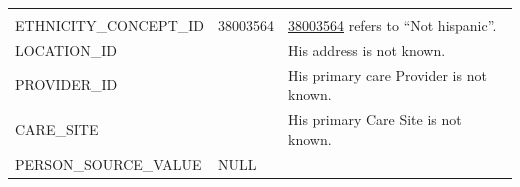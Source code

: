 \documentclass[11pt]{book}
\theoremstyle{definition}
\theoremstyle{definition}
\theoremstyle{definition}
\theoremstyle{remark}
\begin{document}
\begin{longtable}[]{@{}lll@{}}
\begin{minipage}[t]{0.49\columnwidth}
\end{minipage}\tabularnewline
\begin{minipage}[t]{0.28\columnwidth}\raggedright
ETHNICITY\_CONCEPT\_ID\strut
\end{minipage} & \begin{minipage}[t]{0.15\columnwidth}\raggedright
38003564\strut
\end{minipage} & \begin{minipage}[t]{0.49\columnwidth}\raggedright
\href{http://athena.ohdsi.org/search-terms/terms/38003564}{38003564} refers to ``Not hispanic''.\strut
\end{minipage}\tabularnewline
\begin{minipage}[t]{0.28\columnwidth}\raggedright
LOCATION\_ID\strut
\end{minipage} & \begin{minipage}[t]{0.15\columnwidth}\raggedright
\strut
\end{minipage} & \begin{minipage}[t]{0.49\columnwidth}\raggedright
His address is not known.\strut
\end{minipage}\tabularnewline
\begin{minipage}[t]{0.28\columnwidth}\raggedright
PROVIDER\_ID\strut
\end{minipage} & \begin{minipage}[t]{0.15\columnwidth}\raggedright
\strut
\end{minipage} & \begin{minipage}[t]{0.49\columnwidth}\raggedright
His primary care Provider is not known.\strut
\end{minipage}\tabularnewline
\begin{minipage}[t]{0.28\columnwidth}\raggedright
CARE\_SITE\strut
\end{minipage} & \begin{minipage}[t]{0.15\columnwidth}\raggedright
\strut
\end{minipage} & \begin{minipage}[t]{0.49\columnwidth}\raggedright
His primary Care Site is not known.\strut
\end{minipage}\tabularnewline
\begin{minipage}[t]{0.28\columnwidth}\raggedright
PERSON\_SOURCE\_VALUE\strut
\end{minipage} & \begin{minipage}[t]{0.15\columnwidth}\raggedright
NULL\strut
\end{minipage} & \begin{minipage}[t]{0.49\columnwidth}\raggedright

\end{minipage}
\end{longtable}
\end{document}
